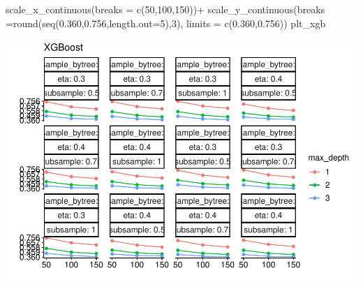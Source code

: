 \documentclass[
]{article}
\newenvironment{Shaded}{\begin{snugshade}}{\end{snugshade}}
\newcommand{\AttributeTok}[1]{\textcolor[rgb]{0.77,0.63,0.00}{#1}}
\newcommand{\DecValTok}[1]{\textcolor[rgb]{0.00,0.00,0.81}{#1}}
\newcommand{\FloatTok}[1]{\textcolor[rgb]{0.00,0.00,0.81}{#1}}
\newcommand{\FunctionTok}[1]{\textcolor[rgb]{0.00,0.00,0.00}{#1}}
\newcommand{\NormalTok}[1]{#1}
\newcommand{\SpecialCharTok}[1]{\textcolor[rgb]{0.00,0.00,0.00}{#1}}
\begin{document}
\begin{Shaded}
\begin{Highlighting}[]
  \FunctionTok{scale\_x\_continuous}\NormalTok{(}\AttributeTok{breaks =} \FunctionTok{c}\NormalTok{(}\DecValTok{50}\NormalTok{,}\DecValTok{100}\NormalTok{,}\DecValTok{150}\NormalTok{))}\SpecialCharTok{+}
  \FunctionTok{scale\_y\_continuous}\NormalTok{(}\AttributeTok{breaks =}\FunctionTok{round}\NormalTok{(}\FunctionTok{seq}\NormalTok{(}\FloatTok{0.360}\NormalTok{,}\FloatTok{0.756}\NormalTok{,}\AttributeTok{length.out=}\DecValTok{5}\NormalTok{),}\DecValTok{3}\NormalTok{),}
                     \AttributeTok{limits =} \FunctionTok{c}\NormalTok{(}\FloatTok{0.360}\NormalTok{,}\FloatTok{0.756}\NormalTok{))}
\NormalTok{plt\_xgb}
\end{Highlighting}
\end{Shaded}

\includegraphics{sl-inf-cairs-2301_files/figure-latex/optResults-12.pdf}
\end{document}
